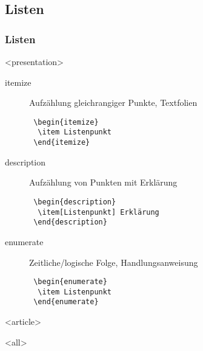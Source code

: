 \newpage

\subsection{Listen}

\begin{frame}[fragile]
\frametitle<presentation>{Listen}




\mode
<presentation>

\begin{description}
 \item[itemize] Aufzählung gleichrangiger Punkte, Textfolien
\begin{block}{}\footnotesize
\begin{verbatim}
 \begin{itemize}
  \item Listenpunkt
 \end{itemize}\end{verbatim}\normalsize\end{block}
 \item[description] Aufzählung von Punkten mit Erklärung
\begin{block}{}\footnotesize
\begin{verbatim}
 \begin{description}
  \item[Listenpunkt] Erklärung
 \end{description}\end{verbatim}\normalsize\end{block}
 \item[enumerate] Zeitliche/logische Folge, Handlungsanweisung
\begin{block}{}\footnotesize
\begin{verbatim}
 \begin{enumerate}
  \item Listenpunkt
 \end{enumerate}\end{verbatim}\normalsize\end{block}
\end{description}


\mode
<article>

\mode
<all>

\end{frame}
\newpage
